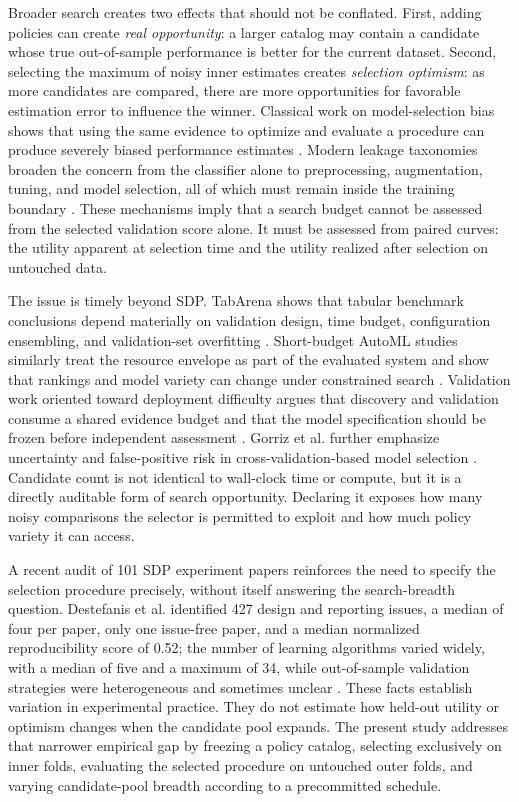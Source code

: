 \documentclass[referee]{USG}
\begin{document}
Broader search creates two effects that should not be conflated. First, adding policies can create \emph{real opportunity}: a larger catalog may contain a candidate whose true out-of-sample performance is better for the current dataset. Second, selecting the maximum of noisy inner estimates creates \emph{selection optimism}: as more candidates are compared, there are more opportunities for favorable estimation error to influence the winner. Classical work on model-selection bias shows that using the same evidence to optimize and evaluate a procedure can produce severely biased performance estimates \cite{cawley2010overfitting,varma2006bias}. Modern leakage taxonomies broaden the concern from the classifier alone to preprocessing, augmentation, tuning, and model selection, all of which must remain inside the training boundary \cite{sasse2025leakage}. These mechanisms imply that a search budget cannot be assessed from the selected validation score alone. It must be assessed from paired curves: the utility apparent at selection time and the utility realized after selection on untouched data.

The issue is timely beyond SDP. TabArena shows that tabular benchmark conclusions depend materially on validation design, time budget, configuration ensembling, and validation-set overfitting \cite{erickson2025tabarena}. Short-budget AutoML studies similarly treat the resource envelope as part of the evaluated system and show that rankings and model variety can change under constrained search \cite{camperojurado2025automl}. Validation work oriented toward deployment difficulty argues that discovery and validation consume a shared evidence budget and that the model specification should be frozen before independent assessment \cite{gallitto2025external}. Gorriz et al. further emphasize uncertainty and false-positive risk in cross-validation-based model selection \cite{gorriz2026kfold}. Candidate count is not identical to wall-clock time or compute, but it is a directly auditable form of search opportunity. Declaring it exposes how many noisy comparisons the selector is permitted to exploit and how much policy variety it can access.

A recent audit of 101 SDP experiment papers reinforces the need to specify the selection procedure precisely, without itself answering the search-breadth question. Destefanis et al. identified 427 design and reporting issues, a median of four per paper, only one issue-free paper, and a median normalized reproducibility score of 0.52; the number of learning algorithms varied widely, with a median of five and a maximum of 34, while out-of-sample validation strategies were heterogeneous and sometimes unclear \cite{destefanis2026audit}. These facts establish variation in experimental practice. They do not estimate how held-out utility or optimism changes when the candidate pool expands. The present study addresses that narrower empirical gap by freezing a policy catalog, selecting exclusively on inner folds, evaluating the selected procedure on untouched outer folds, and varying candidate-pool breadth according to a precommitted schedule.
\end{document}
